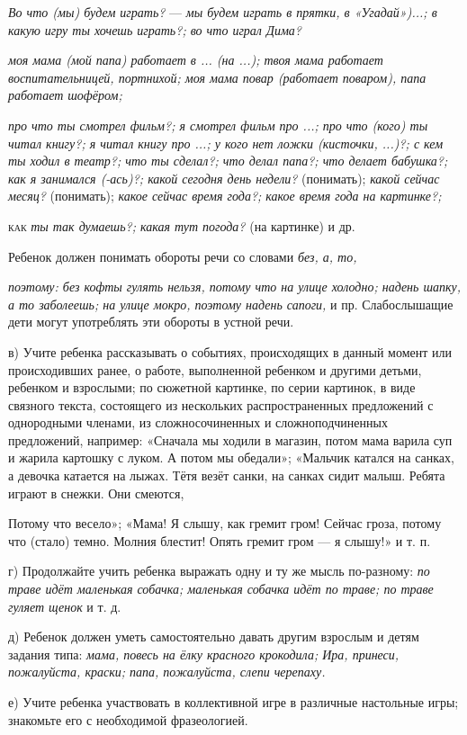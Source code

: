 \documentclass[a5paper]{book}
\renewcommand{\emph}[1]{\textit{#1}}
\begin{document}
\emph{Во что (мы) будем играть?} --- \emph{мы будем играть в прятки, в
«Угадай»)...; в какую игру ты хочешь играть?; во что играл Дима?}

\emph{моя мама (мой папа) работает в ... (на ...); твоя мама работает
воспитательницей, портнихой; моя мама повар (работает поваром), папа
работает шофёром;}

\emph{про что ты смотрел фильм?; я смотрел фильм про ...; про что (кого)
ты читал книгу?; я читал книгу про ...; у кого нет ложки (кисточки,
...)?; с кем ты ходил в театр?; что ты сделал?; что делал папа?; что
делает бабушка?; как я занимался (-ась)?; какой сегодня день недели?}
(понимать); \emph{какой сейчас месяц?} (понимать); \emph{какое сейчас
время года?; какое время года на картинке?;}

\textsc{как} \emph{ты так думаешь?; какая тут погода?} (на картинке) и
др.

Ребенок должен понимать обороты речи со словами \emph{без, а, то,}

\emph{поэтому: без кофты гулять нельзя, потому что на улице холодно;
надень шапку, а то заболеешь; на улице мокро, поэтому надень сапоги,} и
пр. Слабослышащие дети могут употреблять эти обороты в устной речи.

в) Учите ребенка рассказывать о событиях, происходящих в данный момент
или происходивших ранее, о работе, выполненной ребенком и другими
детьми, ребенком и взрослыми; по сюжетной картинке, по серии картинок, в
виде связного текста, состоящего из нескольких распространенных
предложений с однородными членами, из сложносочиненных и
сложноподчиненных предложений, например: «Сначала мы ходили в магазин,
потом мама варила суп и жарила картошку с луком. А потом мы обедали»;
«Мальчик катался на санках, а девочка катается на лыжах. Тётя везёт
санки, на санках сидит малыш. Ребята играют в снежки. Они смеются,

Потому что весело»; «Мама! Я слышу, как гремит гром! Сейчас гроза,
потому что (стало) темно. Молния блестит! Опять гремит гром --- я
слышу!» и т. п.

г) Продолжайте учить ребенка выражать одну и ту же мысль по-разному:
\emph{по траве идёт маленькая собачка; маленькая собачка идёт по траве;
по траве гуляет щенок} и т. д.

д) Ребенок должен уметь самостоятельно давать другим взрослым и детям
задания типа: \emph{мама, повесь на ёлку красного крокодила; Ира,
принеси, пожалуйста, краски; папа, пожалуйста, слепи черепаху.}

е) Учите ребенка участвовать в коллективной игре в различные настольные
игры; знакомьте его с необходимой фразеологией.
\end{document}
